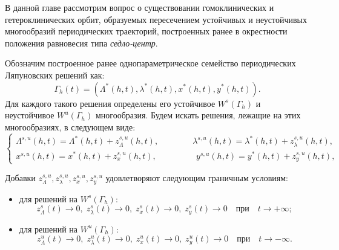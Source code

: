 В данной главе рассмотрим вопрос о существовании гомоклинических и гетероклинических орбит, образуемых пересечением устойчивых и неустойчивых многообразий периодических траекторий, построенных ранее в окрестности положения равновесия типа \textit{седло-центр}.

Обозначим построенное ранее однопараметрическое семейство периодических Ляпуновских решений как: 
\begin{equation}
\Gamma_h(t)=(\Lambda^*(h,t),\lambda^*(h,t),x^*(h,t),y^*(h,t)).
\label{lap_sol}
\end{equation}
Для каждого такого решения определены его устойчивое $W^s(\Gamma_h)$ и неустойчивое $W^u(\Gamma_h)$
многообразия. Будем искать решения, лежащие на этих многообразиях, в следующем виде:
\begin{equation}
    \begin{cases}
        \Lambda^{s,u}(h,t) = \Lambda^*(h,t) + z^{s,u}_\Lambda(h,t), \qquad \qquad
        \lambda^{s,u}(h,t) = \lambda^*(h,t) + z^{s,u}_\lambda(h,t),\\
        x^{s,u}(h,t) = x^*(h,t) + z_x^{s,u}(h,t), \text{ } \qquad \qquad
        y^{s,u}(h,t) = y^*(h,t) + z_y^{s,u}(h,t),
    \end{cases}
    \label{het_predst}
\end{equation}

Добавки $z_\Lambda^{s,u}, z_\lambda^{s,u}, z_x^{s,u}, z_y^{s,u}$ удовлетворяют
следующим граничным условиям:
\begin{itemize}
    \item для решений на $W^s(\Gamma_h)$:
        \[
        z_\Lambda^{s}(t)\to 0,\; z_\lambda^{s}(t)\to 0,\; z_x^{s}(t)\to 0,\; z_y^{s}(t)\to 0 \quad\text{при}\quad t\to +\infty;
        \]
    \item для решений на $W^u(\Gamma_h)$:
        \[
        z_\Lambda^{u}(t)\to 0,\; z_\lambda^{u}(t)\to 0,\; z_x^{u}(t)\to 0,\; z_y^{u}(t)\to 0 \quad\text{при}\quad t\to -\infty.
        \]
\end{itemize}



